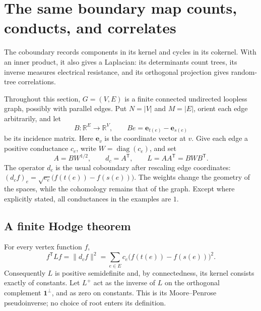 \documentclass[11pt]{article}
\theoremstyle{definition}
\theoremstyle{remark}
\newcommand{\R}{\mathbb R}
\begin{document}
\section{The same boundary map counts, conducts, and correlates}
\label{sec:graph-linear}

The coboundary records components in its kernel and cycles in its cokernel. With an inner product, it also gives a Laplacian: its determinants count trees, its inverse measures electrical resistance, and its orthogonal projection gives random-tree correlations.

Throughout this section, $G=(V,E)$ is a finite connected undirected loopless graph, possibly with parallel edges. Put $N=|V|$ and $M=|E|$, orient each edge arbitrarily, and let
\[
 B:\R^E\longrightarrow\R^V,
 \qquad Be=\mathbf e_{t(e)}-\mathbf e_{s(e)}
\]
be its incidence matrix. Here $\mathbf e_v$ is the coordinate vector at $v$. Give each edge a positive conductance $c_e$, write $W=\operatorname{diag}(c_e)$, and set
\[
 A=BW^{1/2},\qquad d_c=A^{\mathsf T},\qquad
 L=AA^{\mathsf T}=BWB^{\mathsf T}.
\]
The operator $d_c$ is the usual coboundary after rescaling edge coordinates: $(d_cf)_e=\sqrt{c_e}\bigl(f(t(e))-f(s(e))\bigr)$. The weights change the geometry of the spaces, while the cohomology remains that of the graph. Except where explicitly stated, all conductances in the examples are $1$.

\subsection{A finite Hodge theorem}

For every vertex function $f$,
\begin{equation}\label{eq:glin-energy}
 f^{\mathsf T}Lf=\|d_cf\|^2
 =\sum_{e\in E}c_e\bigl(f(t(e))-f(s(e))\bigr)^2.
\end{equation}
Consequently $L$ is positive semidefinite and, by connectedness, its kernel consists exactly of constants. Let $L^+$ act as the inverse of $L$ on the orthogonal complement $\mathbf1^\perp$, and as zero on constants. This is its Moore--Penrose pseudoinverse; no choice of root enters its definition.
\end{document}
